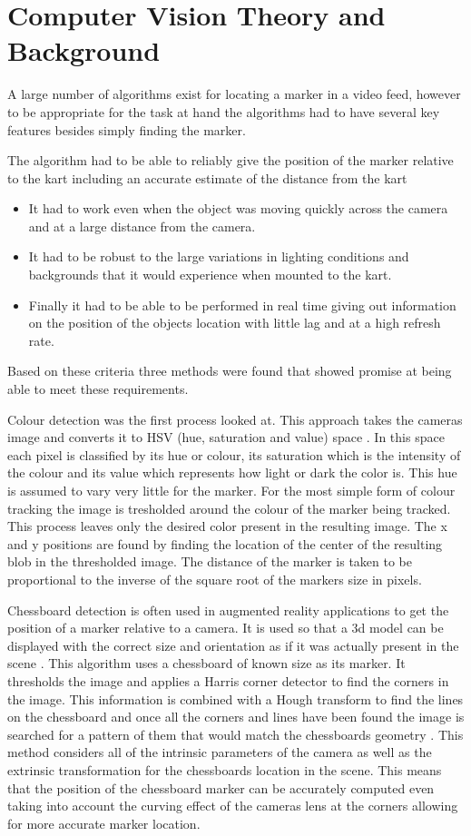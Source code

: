 \section{Computer Vision Theory and Background}

A large number of algorithms exist for locating a marker in a video feed, however to be appropriate for the task at hand the algorithms had to have several key features besides simply finding the marker. 

The algorithm had to be able to reliably give the position of the marker relative to the kart including an accurate estimate of the distance from the kart
\begin{itemize}
\item It had to work even when the object was moving quickly across the camera and at a large distance from the camera. 
\item It had to be robust to the large variations in lighting conditions and backgrounds that it would experience when mounted to the kart. 
\item Finally it had to be able to be performed in real time giving out information on the position of the objects location with little lag and at a high refresh rate. 
\end{itemize}
Based on these criteria three methods were found that showed promise at being able to meet these requirements.

Colour detection was the first process looked at. This approach takes the cameras image and converts it to HSV (hue, saturation and value) space \cite{hsv}. In this space each pixel is classified by its hue or colour, its saturation which is the intensity of the colour and its value which represents how light or dark the color is. This hue is assumed to vary very little for the marker. For the most simple form of colour tracking the image is tresholded around the colour of the marker being tracked. This process leaves only the desired color present in the resulting image. The x and y positions are found by finding the location of the center of the resulting blob in the thresholded image. The distance of the marker is taken to be proportional to the inverse of the square root of the markers size in pixels.

Chessboard detection is often used in augmented reality applications to get the position of a marker relative to a camera.  It is used so that a 3d model can be displayed with the correct size and orientation as if it was actually present in the scene \cite{augmented}. This algorithm uses a chessboard of known size as its marker. It thresholds the image and applies a Harris corner detector to find the corners in the image. This information is combined with a Hough transform to find the lines on the chessboard and once all the corners and lines have been found the image is searched for a pattern of them that would match the chessboards geometry \cite{chessboard}. This method considers all of the intrinsic parameters of the camera as well as the extrinsic transformation for the chessboards location in the scene. This means that the position of the chessboard marker can be accurately computed even taking into  account the curving effect of the cameras lens at the corners allowing for more accurate marker location. 


